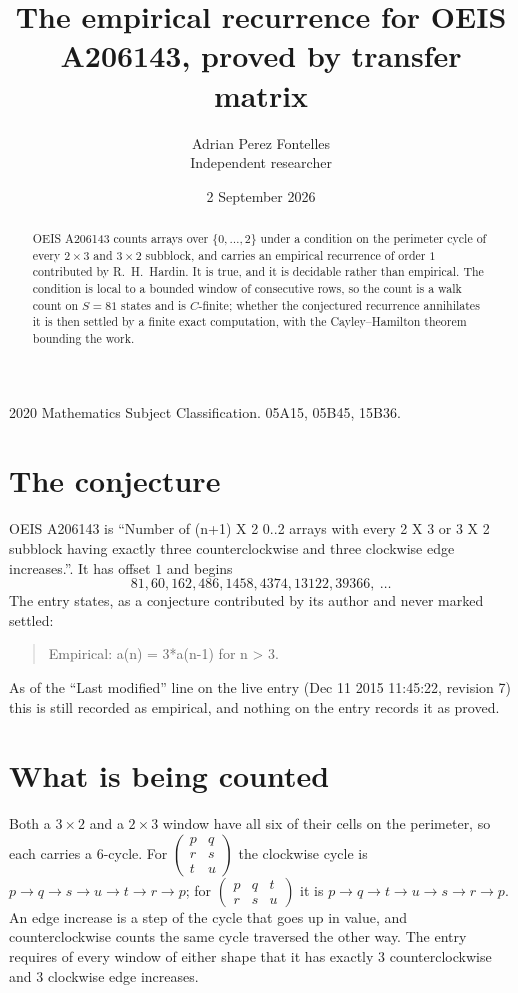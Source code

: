 \documentclass[11pt,a4paper]{article}
\title{The empirical recurrence for OEIS A206143, proved by transfer matrix}
\author{Adrian Perez Fontelles\\ \small Independent researcher}
\date{2 September 2026}
\theoremstyle{plain}
\theoremstyle{definition}
\begin{document}
\maketitle

\begin{abstract}
OEIS A206143 counts arrays over $\{0,\dots,2\}$ under a condition on the perimeter cycle of
every $2\times3$ and $3\times2$ subblock, and carries an empirical recurrence of order $1$ contributed by
R.~H.~Hardin. It is true, and it is decidable rather than empirical. The condition is local to
a bounded window of consecutive rows, so the count is a walk count on $S=81$ states and is
$C$-finite; whether the conjectured recurrence annihilates it is then settled by a finite exact
computation, with the Cayley--Hamilton theorem bounding the work.
\end{abstract}

\noindent\small 2020 Mathematics Subject Classification. 05A15, 05B45, 15B36.\normalsize

\section{The conjecture}

OEIS A206143 is ``Number of (n+1) X 2 0..2 arrays with every 2 X 3 or 3 X 2 subblock having exactly three counterclockwise and three clockwise edge increases.''. It has offset $1$ and begins
\[
81, 60, 162, 486, 1458, 4374, 13122, 39366,\ \dots
\]
The entry states, as a conjecture contributed by its author and never marked settled:
\begin{quote}
Empirical: a(n) = 3*a(n-1) for n > 3.
\end{quote}
As of the ``Last modified'' line on the live entry (Dec 11 2015 11:45:22, revision 7) this is still
recorded as empirical, and nothing on the entry records it as proved.

\section{What is being counted}

Both a $3\times2$ and a $2\times3$ window have all six of their cells on the
perimeter, so each carries a $6$-cycle. For
$\begin{pmatrix}p&q\\r&s\\t&u\end{pmatrix}$ the clockwise cycle is
$p\to q\to s\to u\to t\to r\to p$; for
$\begin{pmatrix}p&q&t\\r&s&u\end{pmatrix}$ it is
$p\to q\to t\to u\to s\to r\to p$. An edge increase is a step of the cycle that goes up in
value, and counterclockwise counts the same cycle traversed the other way. The entry requires
of every window of either shape that it has exactly $3$ counterclockwise and $3$ clockwise edge increases.
\end{document}

